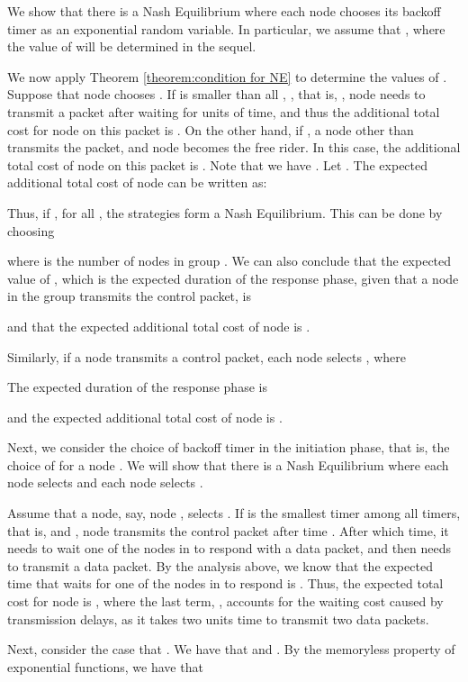 \documentclass[11pt, conference]{IEEEtran}
\begin{document}
We show that there is a Nash Equilibrium where each node  chooses its backoff timer as an exponential random variable. In particular, we assume that , where the value of  will be determined in the sequel.

We now apply Theorem \ref{theorem:condition for NE} to determine the values of . Suppose that node  chooses . If  is smaller than all , , that is, , node  needs to transmit a packet after waiting for  units of time, and thus the additional total cost for node  on this packet is . On the other hand, if , a node other than  transmits the packet, and node  becomes the free rider. In this case, the additional total cost of node  on this packet is . Note that we have . Let . The expected additional total cost of node  can be written as:



Thus, if , for all , the strategies form a Nash Equilibrium. This can be done by choosing

where  is the number of nodes in group . We can also conclude that the expected value of , which is the expected duration of the response phase, given that a node in the group  transmits the control packet, is

and that the expected additional total cost of node  is .

Similarly, if a node  transmits a control packet, each node  selects , where

The expected duration of the response phase is

and the expected additional total cost of node  is .

Next, we consider the choice of backoff timer in the initiation phase, that is, the choice of  for a node . We will show that there is a Nash Equilibrium where each node  selects  and each node  selects .

Assume that a node, say, node , selects . If  is the smallest timer among all timers, that is,  and , node  transmits the control packet after time . After which time, it needs to wait one of the nodes in  to respond with a data packet, and then  needs to transmit a data packet. By the analysis above, we know that the expected time that  waits for one of the nodes in  to respond is . Thus, the expected total cost for node  is , where the last term, , accounts for the waiting cost caused by transmission delays, as it takes two units time to transmit two data packets.

Next, consider the case that . We have that  and . By the memoryless property of exponential functions, we have that
\end{document}
